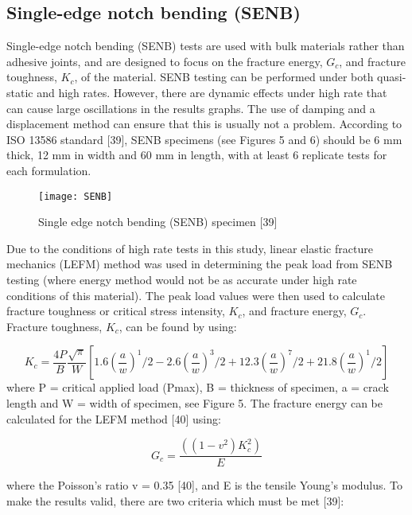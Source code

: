 \documentclass[numbers=noendperiod,chapterprefix=on]{icldt} %
\begin{document}
\subsection{Single-edge notch bending (SENB) }
Single-edge notch bending (SENB) tests are used with bulk materials rather than adhesive joints, and are designed to focus on the fracture energy, $G_c$, and fracture toughness, $K_c$, of the material. SENB testing can be performed under both quasi-static and high rates. However, there are dynamic effects under high rate that can cause large oscillations in the results graphs. The use of damping and a displacement method can ensure that this is usually not a problem. 
According to ISO 13586 standard [39], SENB specimens (see Figures 5 and 6) should be 6 mm thick, 12 mm in width and 60 mm in length, with at least 6 replicate tests for each formulation. 

\begin{figure}[!htpb]
\centering
\texttt{[image: SENB]}
\caption{Single edge notch bending (SENB) specimen [39]} \label{Single edge notch bending (SENB) specimen [39]}
\end{figure}

Due to the conditions of high rate tests in this study, linear elastic fracture mechanics (LEFM) method was used in determining the peak load from SENB testing (where energy method would not be as accurate under high rate conditions of this material). The peak load values were then used to calculate fracture toughness or critical stress intensity, $K_c$, and fracture energy, $G_c$.
Fracture toughness, $K_c$, can be found by using: 

\begin{equation} 
K_c=\frac{4P}{B}\frac{\sqrt{\pi}}{W}\left[1.6 \left( \frac{a}{w}\right)^1/2- 2.6 \left( \frac{a}{w}\right)^3/2 + 12.3 \left( \frac{a}{w}\right)^7/2 +21.8 \left( \frac{a}{w}\right)^1/2\right] 
\end{equation}
where P = critical applied load (Pmax), B = thickness of specimen, a = crack length and W = width of specimen, see Figure 5. 
The fracture energy can be calculated for the LEFM method [40] using:

\begin{equation} 
G_c= \frac{((1-v^2) K_c^2)}{E}
\end{equation}

where the Poisson’s ratio v = 0.35 [40], and E is the tensile Young’s modulus. 
To make the results valid, there are two criteria which must be met [39]:
\end{document}
